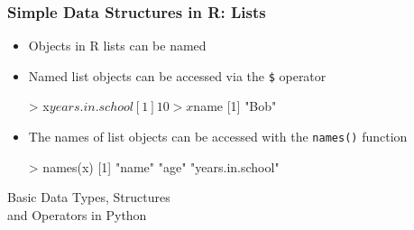 \documentclass{beamer}
\begin{document}
\begin{frame}[fragile]
  \frametitle{Simple Data Structures in R: Lists}


\begin{itemize}

\item Objects in R lists can be named


\item Named list objects can be accessed via the \texttt{\$} operator

\begin{Rcode}
> x$years.in.school
[1] 10
> x$name
[1] "Bob"
\end{Rcode}

\item The names of list objects can be accessed with the \texttt{names()} function

\begin{Rcode}
> names(x)
[1] "name"  "age"  "years.in.school"
\end{Rcode}

\end{itemize}

\end{frame}






\begin{frame}

\begin{center}
\LARGE{Basic Data Types, Structures \\ and Operators in Python}

\end{center}
\end{frame}
\end{document}
